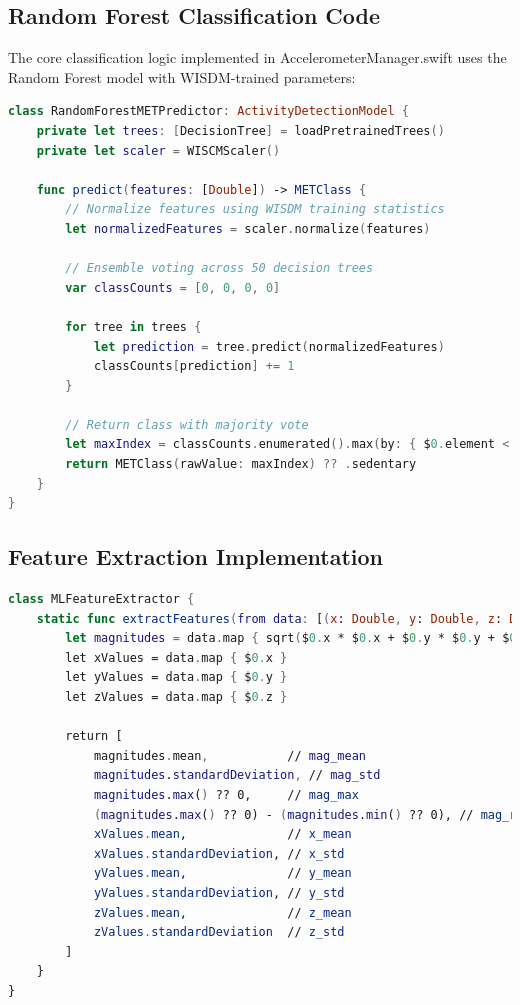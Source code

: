 \documentclass[11pt,a4paper]{article}
\begin{document}
\subsection{Random Forest Classification Code}

The core classification logic implemented in AccelerometerManager.swift uses the Random Forest model with WISDM-trained parameters:

\begin{lstlisting}[language=Swift, caption=Random Forest Implementation]
class RandomForestMETPredictor: ActivityDetectionModel {
    private let trees: [DecisionTree] = loadPretrainedTrees()
    private let scaler = WISCMScaler()
    
    func predict(features: [Double]) -> METClass {
        // Normalize features using WISDM training statistics
        let normalizedFeatures = scaler.normalize(features)
        
        // Ensemble voting across 50 decision trees
        var classCounts = [0, 0, 0, 0]
        
        for tree in trees {
            let prediction = tree.predict(normalizedFeatures)
            classCounts[prediction] += 1
        }
        
        // Return class with majority vote
        let maxIndex = classCounts.enumerated().max(by: { $0.element < $1.element })?.offset ?? 0
        return METClass(rawValue: maxIndex) ?? .sedentary
    }
}
\end{lstlisting}

\subsection{Feature Extraction Implementation}

\begin{lstlisting}[language=Swift, caption=Feature Extraction]
class MLFeatureExtractor {
    static func extractFeatures(from data: [(x: Double, y: Double, z: Double)]) -> [Double] {
        let magnitudes = data.map { sqrt($0.x * $0.x + $0.y * $0.y + $0.z * $0.z) }
        let xValues = data.map { $0.x }
        let yValues = data.map { $0.y }
        let zValues = data.map { $0.z }
        
        return [
            magnitudes.mean,           // mag_mean
            magnitudes.standardDeviation, // mag_std
            magnitudes.max() ?? 0,     // mag_max
            (magnitudes.max() ?? 0) - (magnitudes.min() ?? 0), // mag_range
            xValues.mean,              // x_mean
            xValues.standardDeviation, // x_std
            yValues.mean,              // y_mean
            yValues.standardDeviation, // y_std
            zValues.mean,              // z_mean
            zValues.standardDeviation  // z_std
        ]
    }
}
\end{lstlisting}
\end{document}
